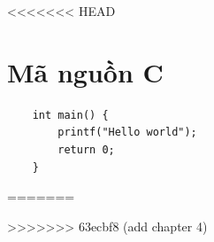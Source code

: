 \documentclass[12pt,a4paper]{report}
\begin{document}
    
    \tableofcontents
    \cleardoublepage 
    
    
    
<<<<<<< HEAD

    \section{Mã nguồn C}
    \begin{verbatim}
    int main() {
        printf("Hello world");
        return 0;
    }
    \end{verbatim}
=======
    
>>>>>>> 63ecbf8 (add chapter 4)

    \makeatletter
    \renewcommand{\appendixname}{Phụ lục}         %
    \renewcommand{\appendixtocname}{Phụ lục}       %
    \renewcommand{\@chapapp}{Phụ lục}              %
    \makeatother
    \begin{appendices}
        
    \end{appendices}
    
\end{document}
